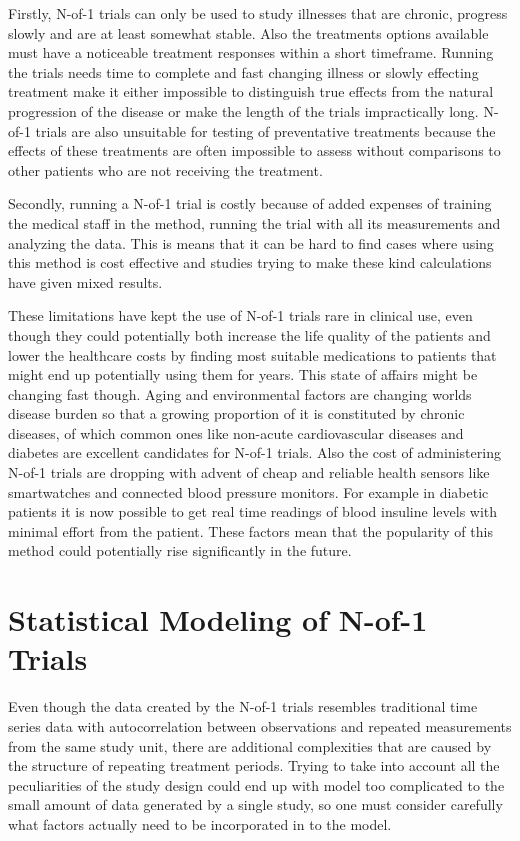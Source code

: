 \documentclass[12pt,a4paper,leqno]{report}
\theoremstyle{plain}
\theoremstyle{definition}
\theoremstyle{remark}
\begin{document}
Firstly, N-of-1 trials can only be used to study illnesses that are chronic, progress
slowly and are at least somewhat stable. Also the treatments options available must have
a noticeable treatment responses within a short timeframe. Running the trials needs time
to complete and fast changing illness or slowly effecting treatment make it either
impossible to distinguish true effects from the natural progression of the disease or
make the length of the trials impractically long. N-of-1 trials are also unsuitable for
testing of preventative treatments because the effects of these treatments are often
impossible to assess without comparisons to other patients who are not receiving the
treatment.

Secondly, running a N-of-1 trial is costly because of added expenses of training the
medical staff in the method, running the trial with all its measurements and analyzing
the data. This is means that it can be hard to find cases where using this method is cost
effective and studies trying to make these kind calculations have given mixed
results\cite{costs}.

These limitations have kept the use of N-of-1 trials rare in clinical use, even though
they could potentially both increase the life quality of the patients and lower the
healthcare costs by finding most suitable medications to patients that might end up
potentially using them for years. This state of affairs might be changing fast though.
Aging and environmental factors are changing worlds disease burden so that a growing
proportion of it is constituted by chronic diseases\cite{diseaseburden}, of which common
ones like non-acute cardiovascular diseases and diabetes are excellent candidates for
N-of-1 trials. Also the cost of administering N-of-1 trials are dropping with advent of
cheap and reliable health sensors like smartwatches and connected blood pressure
monitors. For example in diabetic patients it is now possible to get real time readings
of blood insuline levels with minimal effort from the patient\cite{cgm}. These factors
mean that the popularity of this method could potentially rise significantly in the
future.

\chapter{Statistical Modeling of N-of-1 Trials}\label{modeling}

Even though the data created by the N-of-1 trials resembles traditional time series data
with autocorrelation between observations and repeated measurements from the same study
unit, there are additional complexities that are caused by the structure of repeating
treatment periods. Trying to take into account all the peculiarities of the study design
could end up with model too complicated to the small amount of data generated by a single
study, so one must consider carefully what factors actually need to be incorporated in to
the model.
\end{document}

